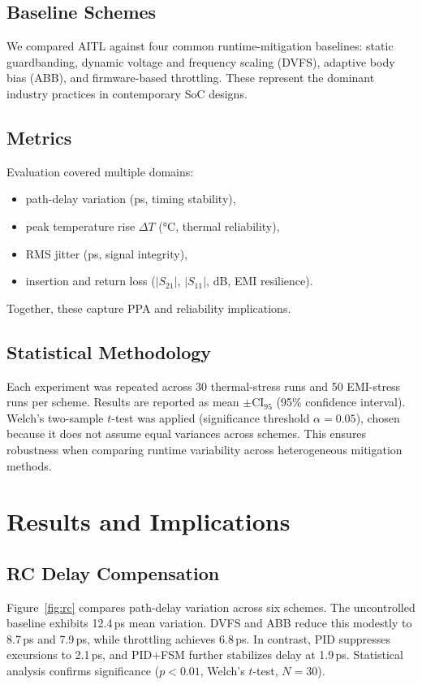 \documentclass[conference]{IEEEtran}
\newcommand{\CI}{\mathrm{CI}_{95}}
\begin{document}
\subsection{Baseline Schemes}
We compared AITL against four common runtime-mitigation baselines: static guardbanding, dynamic voltage and frequency scaling (DVFS), adaptive body bias (ABB), and firmware-based throttling. These represent the dominant industry practices in contemporary SoC designs.

\subsection{Metrics}
Evaluation covered multiple domains:
\begin{itemize}
  \item path-delay variation (ps, timing stability),
  \item peak temperature rise $\Delta T$ (\si{\celsius}, thermal reliability),
  \item RMS jitter (ps, signal integrity),
  \item insertion and return loss ($|S_{21}|$, $|S_{11}|$, dB, EMI resilience).
\end{itemize}
Together, these capture PPA and reliability implications.

\subsection{Statistical Methodology}
Each experiment was repeated across 30 thermal-stress runs and 50 EMI-stress runs per scheme.  
Results are reported as mean $\pm \CI$ (95\% confidence interval). Welch’s two-sample $t$-test was applied (significance threshold $\alpha=0.05$), chosen because it does not assume equal variances across schemes. This ensures robustness when comparing runtime variability across heterogeneous mitigation methods.

\section{Results and Implications}

\subsection{RC Delay Compensation}
Figure~\ref{fig:rc} compares path-delay variation across six schemes.  
The uncontrolled baseline exhibits 12.4\,ps mean variation. DVFS and ABB reduce this modestly to 8.7\,ps and 7.9\,ps, while throttling achieves 6.8\,ps. In contrast, PID suppresses excursions to 2.1\,ps, and PID+FSM further stabilizes delay at 1.9\,ps.  
Statistical analysis confirms significance ($p<0.01$, Welch’s $t$-test, $N=30$).  
\end{document}

